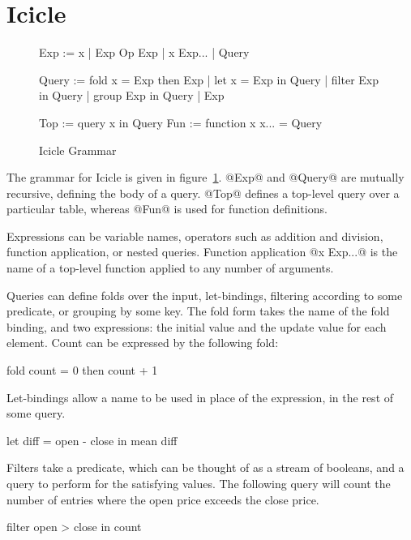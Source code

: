 \section{Icicle}
\label{s:IcicleSource}

\begin{figure}

\begin{code}
Exp   := x | Exp Op Exp | x Exp... | Query

Query := fold x = Exp then Exp
       | let  x = Exp          in Query
       | filter   Exp          in Query
       | group    Exp          in Query
       | Exp

Top   := query x in Query
Fun   := function x x... = Query
\end{code}


\caption{Icicle Grammar}
\label{fig:icicle:grammar}
\end{figure}

The grammar for Icicle is given in figure~\ref{fig:icicle:grammar}.
@Exp@ and @Query@ are mutually recursive, defining the body of a query.
@Top@ defines a top-level query over a particular table, whereas @Fun@ is used for function definitions.

Expressions can be variable names, operators such as addition and division, function application, or nested queries.
Function application @x Exp...@ is the name of a top-level function applied to any number of arguments.

Queries can define folds over the input, let-bindings, filtering according to some predicate, or grouping by some key.
The fold form takes the name of the fold binding, and two expressions: the initial value and the update value for each element.
Count can be expressed by the following fold:
\begin{code}
fold count = 0 then count + 1
\end{code}

Let-bindings allow a name to be used in place of the expression, in the rest of some query.
\begin{code}
let diff = open - close
in  mean diff
\end{code}

Filters take a predicate, which can be thought of as a stream of booleans, and a query to perform for the satisfying values.
The following query will count the number of entries where the open price exceeds the close price.
\begin{code}
filter open > close in count
\end{code}

